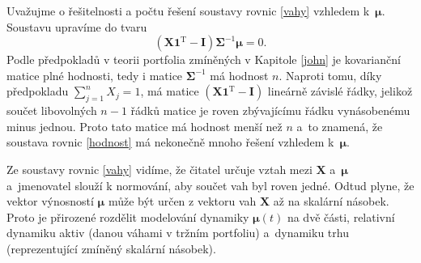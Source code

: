\documentclass[a4paper,12pt]{report}
\theoremstyle{definition} \newtheorem{definice}[veta]{Definice}
\theoremstyle{remark}
\begin{document}
Uvažujme o řešitelnosti a počtu řešení soustavy rovnic \eqref{vahy} vzhledem k~$\boldsymbol{\mu}$.
Soustavu upravíme do tvaru %
\begin{equation} \label{hodnost}
\left(\boldsymbol{X}\boldsymbol{1}^\mathrm{T}-\mathbf{I}\right)\boldsymbol{\Sigma}^{-1}\boldsymbol{\mu}=0.
\end{equation}
Podle předpokladů v teorii portfolia zmíněných v Kapitole \ref{john} je kovarianční matice plné hodnosti, tedy i matice $\boldsymbol{\Sigma}^{-1}$ má hodnost $n$.
Naproti tomu, díky předpokladu $\sum_{j=1}^nX_j=1$, má matice $\left(\boldsymbol{X}\boldsymbol{1}^\mathrm{T}-\mathbf{I}\right)$ lineárně závislé řádky, jelikož
součet libovolných $n-1$ řádků matice  je roven zbývajícímu řádku vynásobenému minus jednou.
%
Proto tato matice má hodnost menší než $n$ a~to znamená, že soustava rovnic \eqref{hodnost} má nekonečně mnoho řešení vzhledem k~$\boldsymbol{\mu}$.

Ze soustavy rovnic \eqref{vahy} vidíme, že čitatel určuje vztah mezi $\boldsymbol{X}$ a~$\boldsymbol{\mu}$ a~jmenovatel slouží k normování, aby součet vah byl roven jedné.
Odtud plyne, že vektor výnosností  $\boldsymbol{\mu}$ může být určen z vektoru vah $\boldsymbol{X}$ až na skalární násobek.
Proto je přirozené rozdělit modelování dynamiky $\boldsymbol{\mu}(t)$ na dvě části, relativní dynamiku aktiv (danou váhami v tržním portfoliu) a~dynamiku trhu (reprezentující zmíněný skalární násobek).
\end{document}
